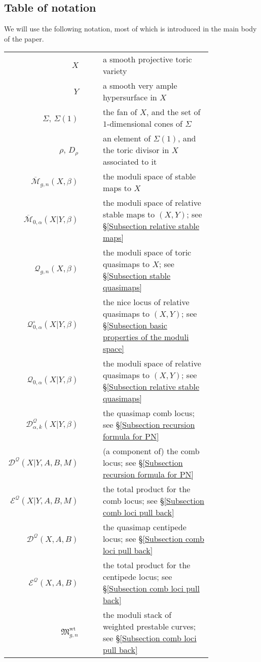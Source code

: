 \documentclass[11pt]{amsart}
\newcommand{\M}[4]{\overline{\mathcal{M}}_{#1,#2}(#3,#4)}
\newcommand{\Q}[4]{\mathcal{Q}_{#1,#2}(#3,#4)}
\newcommand{\MM}{\mathfrak M}
\theoremstyle{definition}
\theoremstyle{definition}
\begin{document}
\subsection{Table of notation} We will use the following notation, most of which is introduced in the main body of the paper.
\begin{longtabu}{r c c p{0.8\linewidth}}
$X$ & & & a smooth projective toric variety \\
$Y$ & & & a smooth very ample hypersurface in $X$ \\
$\Sigma$, $\Sigma(1)$ & & & the fan of $X$, and the set of $1$-dimensional cones of $\Sigma$ \\
$\rho$, $D_\rho$ & & & an element of $\Sigma(1)$, and the toric divisor in $X$ associated to it \\
$\M{g}{n}{X}{\beta}$ & & & the moduli space of stable maps to $X$ \\
$\M{0}{\alpha}{X|Y}{\beta}$ & & & the moduli space of relative stable maps to $(X,Y)$; see \S \ref{Subsection relative stable maps} \\
$\Q{g}{n}{X}{\beta}$ & & & the moduli space of toric quasimaps to $X$; see \S \ref{Subsection stable quasimaps} \\
$\mathcal{Q}^{\circ}_{0,\alpha}(X|Y,\beta)$ & & & the nice locus of relative quasimaps to $(X,Y)$; see \S \ref{Subsection basic properties of the moduli space} \\
$\Q{0}{\alpha}{X|Y}{\beta}$ & & & the moduli space of relative quasimaps to $(X,Y)$; see \S \ref{Subsection relative stable quasimaps} \\
$\mathcal{D}^{\mathcal{Q}}_{\alpha,k}(X|Y,\beta)$ & & & the quasimap comb locus; see \S \ref{Subsection recursion formula for PN} \\
$\mathcal{D}^{\mathcal{Q}}(X|Y,A,B,M)$ & & & (a component of) the comb locus; see \S \ref{Subsection recursion formula for PN} \\
$\mathcal{E}^{\mathcal{Q}}(X|Y,A,B,M)$ & & & the total product for the comb locus; see \S \ref{Subsection comb loci pull back} \\
$\mathcal{D}^{\mathcal{Q}}(X,A,B)$ & & & the quasimap centipede locus; see \S \ref{Subsection comb loci pull back} \\
$\mathcal{E}^{\mathcal{Q}}(X,A,B)$ & & & the total product for the centipede locus; see \S \ref{Subsection comb loci pull back} \\
$\MM^{\operatorname{wt}}_{g,n}$ & & & the moduli stack of weighted prestable curves; see \S \ref{Subsection comb loci pull back} \\

\end{longtabu}
\end{document}
